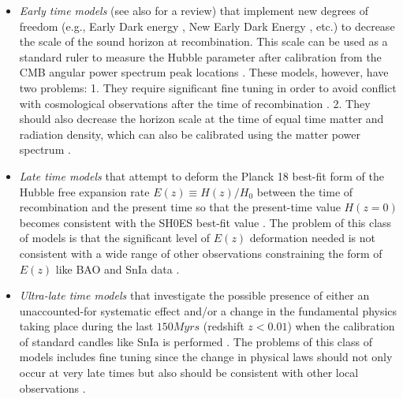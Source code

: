 \documentclass[universe,article,accept,moreauthors,pdftex]{Definitions/mdpi}
\begin{document}
\begin{itemize}
\item \textit{Early time models} \cite{article01,Poulin:2018cxd,PhysRevD.101.063523,Niedermann:2019olb,Herold:2022iib} (see also \cite{Abdalla:2022yfr} for a review)  that implement new degrees of  freedom (e.g., Early Dark energy \cite{Poulin:2023lkg,article01,Poulin:2018cxd,PhysRevD.101.063523}, New Early Dark Energy \cite{Niedermann:2019olb,Herold:2022iib}, etc.) 
 to decrease the scale of the sound horizon at recombination. 
 This scale can be used as a standard ruler to measure the Hubble parameter \cite{Bernal:2016gxb,Aylor:2018drw} after calibration from the CMB angular power spectrum peak locations \cite{Planck:2018vyg}. These models, however, have two problems: 1. They require significant fine tuning in order to avoid conflict with cosmological observations after the time of recombination \cite{Vagnozzi:2021gjh,Hill:2021yec}. 2. They should also decrease the horizon scale at the time of equal time matter and radiation density, which can also be calibrated using the matter power spectrum \cite{Brieden:2022heh,Bernal:2021yli}.
 
 \item {\it Late {time models}} %
\cite{Wang:2017cel,Yang:2019qza,Cai:2021wgv,Li:2019yem,DiValentino:2020naf,DiValentino:2020kha,Benevento:2022cql,Heisenberg:2022lob,Hernandez-Almada:2021aiw} that attempt to deform the Planck 18 best-fit \lcdm form of the Hubble free expansion rate $E(z)\equiv H(z)/H_0$ between the time of recombination and the present time so that the present-time value $H(z=0)$ becomes consistent with the SH0ES best-fit value \cite{Riess:2021jrx}. The problem of this class of models is that the significant level of $E(z)$ deformation needed is not consistent with a wide range of other observations constraining the form of $E(z)$ like BAO and SnIa data \cite{Alestas:2021xes,Benevento:2020fev,Alestas:2021luu,DiValentino}.
 \item {{\it Ultra-late time models}} \cite{Marra:2021fvf,Alestas:2020zol,Alestas:2021luu,Perivolaropoulos:2023iqj,Alestas:2021nmi,Perivolaropoulos:2022vql} that investigate the possible presence of either an unaccounted-for systematic effect and/or a change in the fundamental physics taking place during the last $150Myrs$ %
 (redshift $z<0.01$) when the calibration of standard candles like SnIa is performed \cite{Perivolaropoulos:2022khd}. The problems of this class of models includes fine tuning since the change in physical laws should not only occur at very late times but also should be consistent with other local observations \cite{Alestas:2022xxm}.
\end{itemize}
\end{document}
